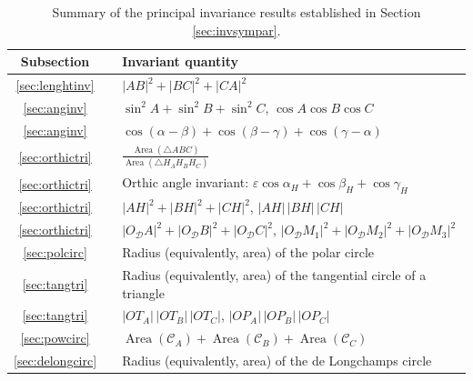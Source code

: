 \documentclass[11pt,reqno]{amsart}
\theoremstyle{definition}
\numberwithin{equation}{section}
\begin{document}
\begin{table}[ht]
\centering
\caption{Summary of the principal invariance results established in Section \ref{sec:invsympar}.}
\label{tab:invariants}
\renewcommand{\arraystretch}{1.15}
\begin{tabular}{ccl}
\hline
\textbf{Subsection} && \textbf{Invariant quantity} \\
\hline
\ref{sec:lenghtinv} && $|AB|^2+ |BC|^2+ |CA|^2$\\

\ref{sec:anginv} && $ \sin^2 A+ \sin^2 B+ \sin^2 C$, \qquad $\cos A \cos B \cos C$\\

\ref{sec:anginv} && $\displaystyle \cos(\alpha-\beta)+\cos(\beta-\gamma)+\cos(\gamma-\alpha)$\\

\ref{sec:orthictri} &&
$\displaystyle
\frac{\operatorname{Area}(\triangle ABC)}
{\operatorname{Area}(\triangle H_AH_BH_C)}
$\\

\ref{sec:orthictri} &&
Orthic angle invariant:
$\varepsilon\cos\alpha_H+\cos\beta_H+\cos\gamma_H$\\

\ref{sec:orthictri} &&
$|AH|^2+|BH|^2+|CH|^2$, \qquad $|AH|\,|BH|\,|CH|$\\

\ref{sec:orthictri} &&
$|O_{\mathcal D}A|^2+
|O_{\mathcal D}B|^2+
|O_{\mathcal D}C|^2$, \qquad $|O_{\mathcal D}M_1|^2+
|O_{\mathcal D}M_2|^2+
|O_{\mathcal D}M_3|^2$\\

\ref{sec:polcirc} && Radius (equivalently, area) of the polar circle\\

\ref{sec:tangtri} &&
Radius (equivalently, area) of the tangential circle of a  triangle\\

\ref{sec:tangtri} &&
$|OT_A|\,|OT_B|\,|OT_C|$, \qquad $|OP_A|\,|OP_B|\,|OP_C|$\\

\ref{sec:powcirc} &&
$\displaystyle \operatorname{Area}(\mathcal C_A)+\operatorname{Area}(\mathcal C_B)+\operatorname{Area}(\mathcal C_C)$\\

\ref{sec:delongcirc} &&
Radius (equivalently, area) of the de Longchamps circle\\
\hline
\end{tabular}
\end{table}
\end{document}
